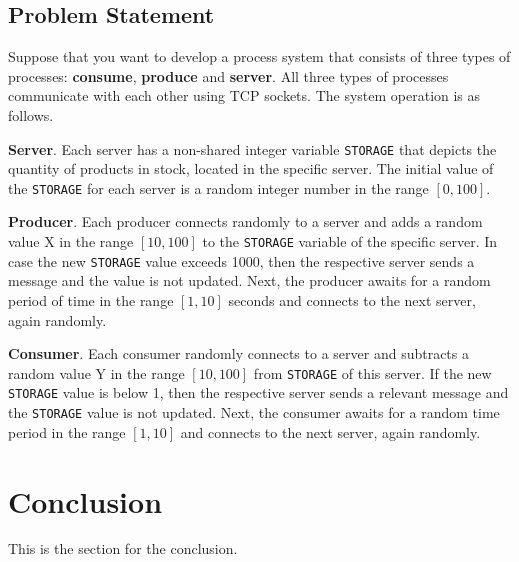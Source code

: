 \documentclass[acmlarge]{acmart}
\newcommand{\storage}{{\small \texttt{STORAGE}} }
\begin{document}
\subsection{Problem Statement}
Suppose that you want to develop a process system that consists of three types of processes: \textbf{consume}, \textbf{produce} and \textbf{server}. All three types of processes communicate with each other using TCP sockets. The system operation is as follows.

\textbf{Server}. Each server has a non-shared integer variable \storage that depicts the quantity of products in stock, located in the specific server. The initial value of the \storage for each server is a random integer number in the range $[0, 100]$.

\textbf{Producer}. Each producer connects randomly to a server and adds a random value X in the range $[10, 100]$ to the \storage variable of the specific server. In case the new \storage value exceeds 1000, then the respective server sends a message and the value is not updated. Next, the producer awaits for a random period of time in the range $[1, 10]$ seconds and connects to the next server, again randomly.

\textbf{Consumer}. Each consumer randomly connects to a server and subtracts a random value Y in the range $[10, 100]$ from \storage of this server. If the new \storage value is below 1, then the respective server sends a relevant message and the \storage value is not updated. Next, the consumer awaits for a random time period in the range $[1, 10]$ and connects to the next server, again randomly.


\section{Conclusion}
\label{section:conclusion}
This is the section for the conclusion.
\end{document}
